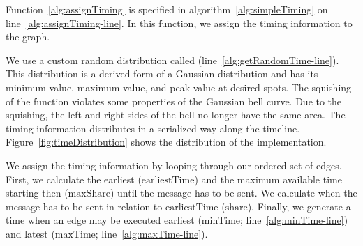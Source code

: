 Function~\ref{alg:assignTiming} is specified in algorithm~\ref{alg:simpleTiming} on line~\ref{alg:assignTiming-line}. In this function, we assign the timing information to the graph. 

We use a custom random distribution called  (line~\ref{alg:getRandomTime-line}). This distribution is a derived form of a Gaussian distribution and has its minimum value, maximum value, and peak value at desired spots. The squishing of the function violates some properties of the Gaussian bell curve. Due to the squishing, the left and right sides of the bell no longer have the same area. The timing information distributes in a serialized way along the timeline. Figure~\ref{fig:timeDistribution} shows the distribution of the implementation.

\begin{figure*}[ht]
	\centering
	
	\caption{Distribution of (90, 120, 200) in algorithm~\ref{alg:simpleTiming}.}
	\label{fig:timeDistribution}
\end{figure*}

We assign the timing information by looping through our ordered set of edges. First, we calculate the earliest ($\text{earliestTime}$) and the maximum available time starting then ($\text{maxShare}$) until the message has to be sent. We calculate when the message has to be sent in relation to $\text{earliestTime}$ ($\text{share}$). Finally, we generate a time when an edge may be executed earliest ($\text{minTime}$; line~\ref{alg:minTime-line}) and latest ($\text{maxTime}$; line~\ref{alg:maxTime-line}).

